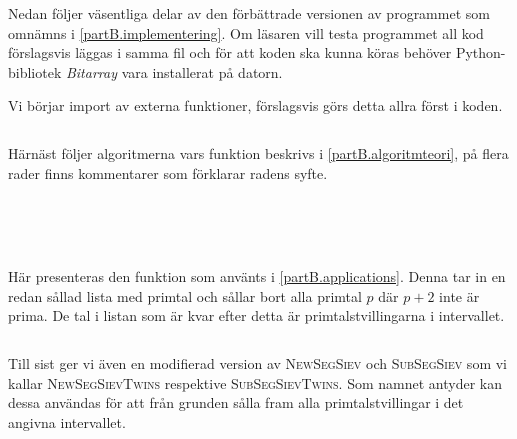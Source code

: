 \newcommand{\code}[1]{\inputminted[frame=lines,fontsize=\footnotesize,linenos]{python}{code/#1.py}}

Nedan följer väsentliga delar av den förbättrade versionen av programmet som omnämns i \ref{partB.implementering}.
Om läsaren vill testa programmet all kod förslagsvis läggas i samma fil och för att koden ska kunna köras behöver Python-bibliotek \textit{Bitarray} vara installerat på datorn.

Vi börjar import av externa funktioner, förslagsvis görs detta allra först i koden.
\code{imports}

Härnäst följer algoritmerna vars funktion beskrivs i \ref{partB.algoritmteori}, 
på flera rader finns kommentarer som förklarar radens syfte.
\code{SimpleSiev} %
\code{SimpleSegSiev} %
\code{SubSegSiev} %
\code{NewSegSiev} %
\code{DiophAppr} %

Här presenteras den funktion som använts i \ref{partB.applications}.
Denna tar in en redan sållad lista med primtal och sållar bort alla primtal $p$ där $p+2$ inte är prima.
De tal i listan som är kvar efter detta är primtalstvillingarna i intervallet.
\code{RemoveNonTwins}\label{code.twins}

Till sist ger vi även en modifierad version av \textsc{NewSegSiev} och \textsc{SubSegSiev} som vi kallar
\textsc{NewSegSievTwins} respektive \textsc{SubSegSievTwins}. 
Som namnet antyder kan dessa användas för att från grunden sålla fram alla primtalstvillingar i det angivna intervallet.
\code{SubSegSievTwins}
\code{NewSegSievTwins}